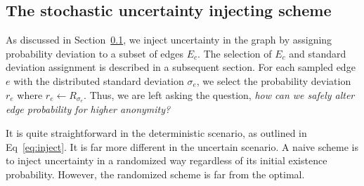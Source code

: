 \subsection{The stochastic uncertainty injecting scheme}
As discussed in Section~\ref{}, we inject uncertainty in the graph by assigning probability deviation to a subset of edges $E_{c}$. The selection of $E_{c}$ and standard deviation assignment is described in a subsequent section. For each sampled edge $e$ with the distributed standard deviation $\sigma_{e}$, we select the probability deviation $r_{e}$ where $r_{e} \leftarrow R_{\sigma_{e}}$. Thus, we are left asking the question, \emph{how can we safely alter edge probability for higher anonymity?}


It is quite straightforward in the deterministic scenario, as outlined in Eq~\ref{eq:inject}. 
It is far more different in the uncertain scenario. A naive scheme is to inject uncertainty in a randomized way regardless of its initial existence probability. However, the randomized scheme is far from the optimal. 

